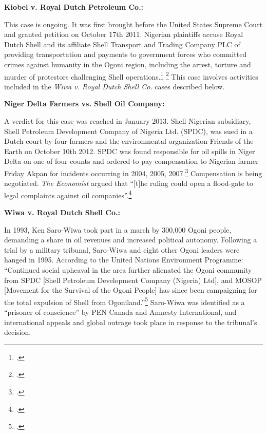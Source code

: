 \textbf{Kiobel v. Royal Dutch Petroleum Co.:} 



This case is ongoing. 
It was first brought before the United States Supreme Court and granted petition on October 17th 2011. 
Nigerian plaintiffs accuse Royal Dutch Shell and its affiliate Shell Transport and Trading Company PLC of providing transportation and payments to government forces who committed crimes against humanity in the Ogoni region, including the arrest, torture and murder of protestors challenging Shell operations.\footcite{KiobelShell} \footcite{TortureComplicity}
This case involves activities included in the \emph{Wiwa v. Royal Dutch Shell Co.} cases described below.



\textbf{Niger Delta Farmers vs. Shell Oil Company:} 



A verdict for this case was reached in January 2013. 
Shell Nigerian subsidiary, Shell Petroleum Development Company of Nigeria Ltd. (SPDC), was sued in a Dutch court by four farmers and the environmental organization Friends of the Earth on October 10th 2012. 
SPDC was found responsible for oil spills in Niger Delta on one of four counts and ordered to pay compensation to Nigerian farmer Friday Akpan for incidents occurring in 2004, 2005, 2007.\footcite{OrderedFarmer}
Compensation is being negotiated. 
\emph{The Economist} argued that ``[t]he ruling could open a flood-gate to legal complaints against oil companies''.\footcite{MixedVerdict}



\textbf{Wiwa v. Royal Dutch Shell Co.:}



In 1993, Ken Saro-Wiwa took part in a march by 300,000 Ogoni people, demanding a share in oil revenues and increased political autonomy.
Following a trial by a military tribunal, Saro-Wiwa and eight other Ogoni leaders were hanged in 1995.
According to the United Nations Environment Programme: ``Continued social upheaval in the area further alienated the Ogoni community from SPDC [Shell Petroleum Development Company (Nigeria) Ltd], and MOSOP [Movement for the Survival of the Ogoni People] has since been campaigning for the total expulsion of Shell from Ogoniland.''\footcite[][p.27]{Ogoniland}
Saro-Wiwa was identified as a ``prisoner of conscience'' by PEN Canada and Amnesty International, and international appeals and global outrage took place in response to the tribunal's decision.



